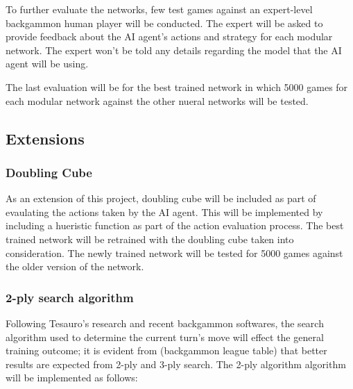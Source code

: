 \documentclass[12pt,a4paper]{article}
\begin{document}
To further evaluate the networks, few test games against an expert-level backgammon human player will be conducted. The expert will be asked to provide feedback about the AI agent's actions and strategy for each modular network. The expert won't be told any details regarding the model that the AI agent will be using. 

The last evaluation will be for the best trained network in which 5000 games for each modular network against the other nueral networks will be tested. 

\subsection{Extensions}
\subsubsection{Doubling Cube}
As an extension of this project, doubling cube will be included as part of evaulating the actions taken by the AI agent. This will be implemented by including a hueristic function as part of the action evaluation process. The best trained network will be retrained with the doubling cube taken into consideration. The newly trained network will be tested for 5000 games against the older version of the network. 

\subsubsection{2-ply search algorithm}
Following Tesauro's research and recent backgammon softwares, the search algorithm used to determine the current turn's move will effect the general training outcome; it is evident from (backgammon league table) that better results are expected from 2-ply and 3-ply search. The 2-ply algorithm algorithm will be implemented as follows:
\end{document}
